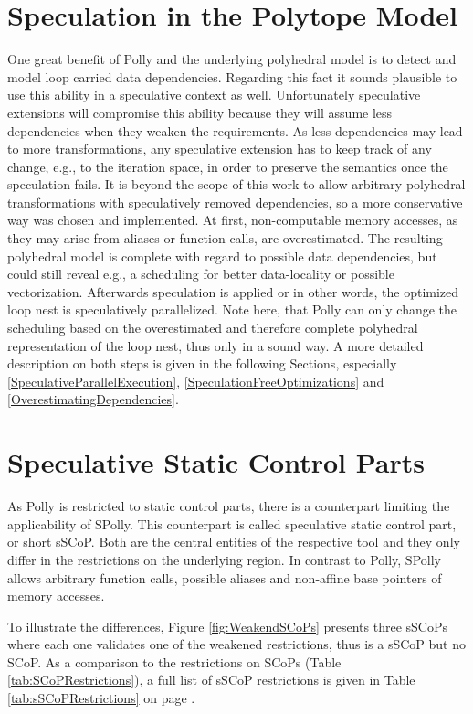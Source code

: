 \section{Speculation in the Polytope Model}
One great benefit of Polly and the underlying polyhedral model
is to detect and model loop carried data dependencies. Regarding this fact it
sounds plausible to use this ability in a speculative context as well.
Unfortunately speculative 
extensions will compromise this ability because they will assume
less dependencies when they weaken the requirements. As less dependencies may
lead to more transformations, any speculative extension has to keep track of 
 any change, e.g., to the iteration space, in order to preserve the semantics 
once the speculation fails. It is beyond the scope of this work to allow 
arbitrary polyhedral transformations with speculatively removed dependencies, 
so a more conservative way was chosen and implemented. 
At first, non-computable memory accesses, as they may arise from  
aliases or function calls, are overestimated. 
The resulting polyhedral model is complete with regard to possible
data dependencies, but could still reveal e.g., a scheduling for 
better data-locality or possible vectorization. 
Afterwards speculation is applied or in other words, the optimized loop nest is
speculatively  parallelized. 
Note here, that Polly can only change the scheduling based on the
overestimated and therefore complete polyhedral representation of the loop nest,
thus only in a sound way. A more detailed description on both steps is given
in the following Sections, especially \ref{SpeculativeParallelExecution},
\ref{SpeculationFreeOptimizations} and \ref{OverestimatingDependencies}.

\section{Speculative Static Control Parts}
\label{sSCoPs}
As Polly is restricted to static control parts, there is a counterpart limiting
the applicability of SPolly. This counterpart is called 
speculative static control part, or short sSCoP. Both are the central entities of 
the respective tool and they only differ in the restrictions on the underlying region.
In contrast to Polly, SPolly allows arbitrary function calls, possible aliases
and non-affine base pointers of memory accesses.   

To illustrate the differences, Figure \ref{fig:WeakendSCoPs} presents three 
sSCoPs where each one validates one of the weakened restrictions,
thus is a sSCoP but no SCoP. As a comparison
to the restrictions on SCoPs (Table \ref{tab:SCoPRestrictions}), a full list
of sSCoP restrictions is given in Table \ref{tab:sSCoPRestrictions} on page 
\pageref{sSCoPRestrictionsPage}.

